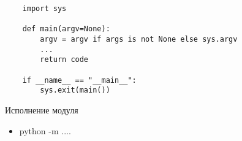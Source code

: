 \documentclass{article}
\begin{document}
\begin{lstlisting}
	import sys

	def main(argv=None):
		argv = argv if args is not None else sys.argv
		...
		return code

	if __name__ == "__main__":
		sys.exit(main())
\end{lstlisting}
\newpage

\begin{center} Исполнение модуля \end{center}
\begin{itemize}
	\item python -m ....
\end{itemize}
\newpage

\end{document}
